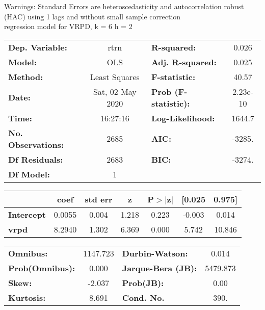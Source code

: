 Warnings: \newline
 [1] Standard Errors are heteroscedasticity and autocorrelation robust (HAC) using 1 lags and without small sample correction\\ 

regression model for VRPD, k = 6 h = 2\begin{center}
\begin{tabular}{lclc}
\toprule
\textbf{Dep. Variable:}    &       rtrn       & \textbf{  R-squared:         } &     0.026   \\
\textbf{Model:}            &       OLS        & \textbf{  Adj. R-squared:    } &     0.025   \\
\textbf{Method:}           &  Least Squares   & \textbf{  F-statistic:       } &     40.57   \\
\textbf{Date:}             & Sat, 02 May 2020 & \textbf{  Prob (F-statistic):} &  2.23e-10   \\
\textbf{Time:}             &     16:27:16     & \textbf{  Log-Likelihood:    } &    1644.7   \\
\textbf{No. Observations:} &        2685      & \textbf{  AIC:               } &    -3285.   \\
\textbf{Df Residuals:}     &        2683      & \textbf{  BIC:               } &    -3274.   \\
\textbf{Df Model:}         &           1      & \textbf{                     } &             \\
\bottomrule
\end{tabular}
\begin{tabular}{lcccccc}
                   & \textbf{coef} & \textbf{std err} & \textbf{z} & \textbf{P$> |$z$|$} & \textbf{[0.025} & \textbf{0.975]}  \\
\midrule
\textbf{Intercept} &       0.0055  &        0.004     &     1.218  &         0.223        &       -0.003    &        0.014     \\
\textbf{vrpd}      &       8.2940  &        1.302     &     6.369  &         0.000        &        5.742    &       10.846     \\
\bottomrule
\end{tabular}
\begin{tabular}{lclc}
\textbf{Omnibus:}       & 1147.723 & \textbf{  Durbin-Watson:     } &    0.014  \\
\textbf{Prob(Omnibus):} &   0.000  & \textbf{  Jarque-Bera (JB):  } & 5479.873  \\
\textbf{Skew:}          &  -2.037  & \textbf{  Prob(JB):          } &     0.00  \\
\textbf{Kurtosis:}      &   8.691  & \textbf{  Cond. No.          } &     390.  \\
\bottomrule
\end{tabular}
\end{center}

